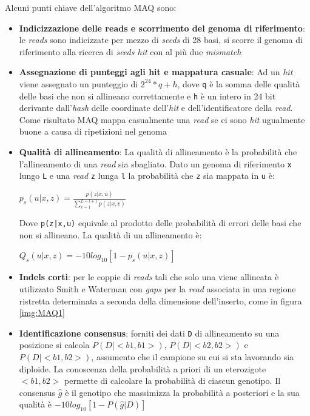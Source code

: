 \documentclass[conference]{IEEEtran}
\begin{document}
Alcuni punti chiave dell'algoritmo MAQ sono:
	\begin{itemize}
		\item \textbf{Indicizzazione delle reads e scorrimento del genoma di riferimento}: le \textit{reads} sono indicizzate per mezzo di \textit{seeds} di 28 basi, si scorre il genoma di riferimento alla ricerca di \textit{seeds hit} con al più due \textit{mismatch}
		\item \textbf{Assegnazione di punteggi agli hit e mappatura casuale}: Ad un \textit{hit} viene assegnato un punteggio di $2^{24}*q+h$, dove \texttt{q} è la somma delle qualità delle basi che non si allineano correttamente e \texttt{h} è un intero in 24 bit derivante dall'\textit{hash} delle coordinate dell'\textit{hit} e dell'identificatore della \textit{read}. Come risultato MAQ mappa casualmente una \textit{read} se ci sono \textit{hit} ugualmente buone a causa di ripetizioni nel genoma
		\item \textbf{Qualità di allineamento}: La qualità di allineamento è la probabilità che l'allineamento di una \textit{read} sia sbagliato. Dato un genoma di riferimento \texttt{x} lungo \texttt{L} e una \textit{read} \texttt{z} lunga \texttt{l} la probabilità che \texttt{z} sia mappata in \texttt{u} è:
\begin{center}
$
p_s(u|x,z) = \frac{p(z|x,u)}{\sum_{v=1}^{L-l+1}p(z|x,v)}
$
\end{center}
Dove \texttt{p(z|x,u)} equivale al prodotto delle probabilità di errori delle basi che non si allineano. La qualità di un allineamento è:
\begin{center}
$
Q_s(u|x,z) = -10 log_{10}\left[1-p_s(u|x,z)\right]
$
\end{center}
		\item \textbf{Indels corti}: per le coppie di \textit{reads} tali che solo una viene allineata è utilizzato Smith e Waterman con \textit{gaps} per la \textit{read} associata in una regione ristretta determinata a seconda della dimensione dell'inserto, come in figura \ref{img:MAQ1}

		\item \textbf{Identificazione consensus}: forniti dei dati \texttt{D} di allineamento su una posizione si calcola $P(D|<b1,b1>)$, $P(D|<b2,b2>)$ e  $P(D|<b1,b2>)$, assumento che il campione su cui si sta lavorando sia diploide. La conoscenza della probabilità a priori di un eterozigote $<b1,b2>$ permette di calcolare la probabilità di ciascun genotipo. Il consensus $\hat g$ è il genotipo che massimizza la probabilità a posteriori e la sua qualità è $-10 log_{10}\left[1-P(\hat g|D)\right]$\\
	\end{itemize}
\end{document}
